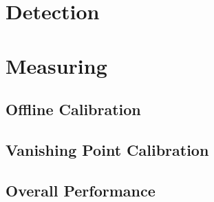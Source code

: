 \section{Detection}
\section{Measuring}
\subsection{Offline Calibration}
\subsection{Vanishing Point Calibration}
\subsection{Overall Performance}
